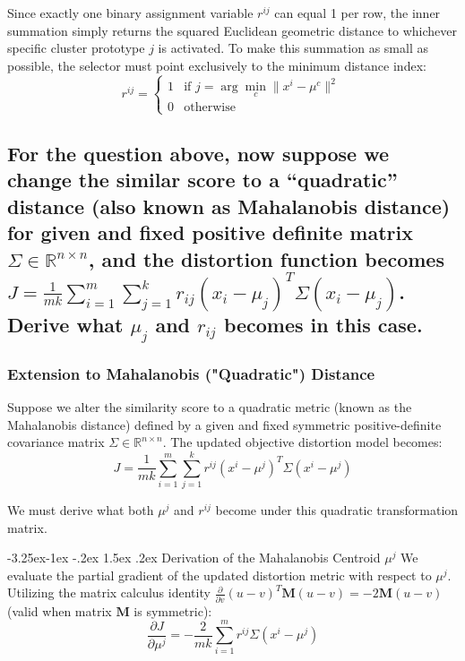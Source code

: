 \documentclass[twoside, 10pt]{article}
\makeatletter
\renewcommand{\paragraph}{\@startsection{paragraph}{4}{\z@}%
    {-3.25ex\@plus -1ex \@minus -.2ex}%
    {1.5ex \@plus .2ex}%
    {\normalfont\normalsize\bfseries}}
\makeatother
\begin{document}
Since exactly one binary assignment variable $r^{ij}$ can equal 1 per row, the inner summation simply returns the squared Euclidean geometric distance to whichever specific cluster prototype $j$ is activated. To make this summation as small as possible, the selector must point exclusively to the minimum distance index:
\begin{equation}
r^{ij} = \begin{cases} 1 & \text{if } j = \arg\min_{c} \|x^i - \mu^c\|^2 \\ 0 & \text{otherwise} \end{cases}
\end{equation}

\subsection{For the question above, now suppose we change the similar score to a ``quadratic'' distance (also known as Mahalanobis distance) for given and fixed positive definite matrix $\Sigma \in \mathbb{R}^{n \times n}$, and the distortion function becomes $J = \frac{1}{mk} \sum_{i=1}^{m} \sum_{j=1}^{k} r_{ij}(x_i - \mu_j)^T \Sigma (x_i - \mu_j)$. Derive what $\mu_j$ and $r_{ij}$ becomes in this case.}

\subsubsection{Extension to Mahalanobis ("Quadratic") Distance}
Suppose we alter the similarity score to a quadratic metric (known as the Mahalanobis distance) defined by a given and fixed symmetric positive-definite covariance matrix $\Sigma \in \mathbb{R}^{n \times n}$. The updated objective distortion model becomes:
\begin{equation}
J = \frac{1}{mk} \sum_{i=1}^{m} \sum_{j=1}^{k} r^{ij} (x^i - \mu^j)^T \Sigma (x^i - \mu^j)
\end{equation}

We must derive what both $\mu^j$ and $r^{ij}$ become under this quadratic transformation matrix.

\paragraph{Derivation of the Mahalanobis Centroid $\mu^j$}
We evaluate the partial gradient of the updated distortion metric with respect to $\mu^j$. Utilizing the matrix calculus identity $\frac{\partial}{\partial v} (u-v)^T \mathbf{M} (u-v) = -2\mathbf{M}(u-v)$ (valid when matrix $\mathbf{M}$ is symmetric):
\begin{equation}
\frac{\partial J}{\partial \mu^j} = -\frac{2}{mk} \sum_{i=1}^{m} r^{ij} \Sigma (x^i - \mu^j)
\end{equation}
\end{document}
